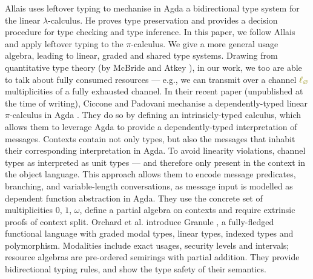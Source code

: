 \documentclass[sigplan,10pt,anonymous,review]{acmart}
\theoremstyle{definition}
\newcommand{\lambdacalc}{$\lambda$-calculus}
\newcommand{\picalc}{$\pi$-calculus}
\newcommand{\func}[1]{\textcolor{olive}{\operatorname{#1}}}
\newcommand{\lz}{\func{\ell_{\varnothing}}}
\begin{document}
Allais \cite{Allais2018a} uses leftover typing to mechanise in Agda a bidirectional type system for the linear \lambdacalc{}.
He proves type preservation and provides a decision procedure for type checking and type inference.
In this paper, we follow Allais \cite{Allais2018a} and apply leftover typing to the \picalc{}.
We give a more general usage algebra, leading to linear, graded and shared type systems.
Drawing from quantitative type theory (by McBride and Atkey \cite{McBride2016, Atkey2018}), in our work, we too are able to talk about fully consumed resources --- e.g., we can transmit over a channel $\lz$ multiplicities of a fully exhausted channel.
%
In their recent paper (unpublished at the time of writing), Ciccone and Padovani mechanise a dependently-typed linear \picalc{} in Agda \cite{Ciccone}.
They do so by defining an intrinsicly-typed calculus, which allows them to leverage Agda to provide a dependently-typed interpretation of messages.
Contexts contain not only types, but also the messages that inhabit their corresponding interpretation in Agda.
To avoid linearity violations, channel types as interpreted as unit types --- and therefore only present in the context in the object language.
This approach allows them to encode message predicates, branching, and variable-length conversations, as message input is modelled as dependent function abstraction in Agda.
They use the concrete set of multiplicities $0$, $1$, $\omega$, define a partial algebra on contexts and require extrinsic proofs of context split.
%
Orchard et al. introduce Granule \cite{Orchard}, a fully-fledged functional language with graded modal types, linear types, indexed types and polymorphism.
Modalities include exact usages, security levels and intervals; resource algebras are pre-ordered semirings with partial addition.
They provide bidirectional typing rules, and show the type safety of their semantics.
\end{document}
